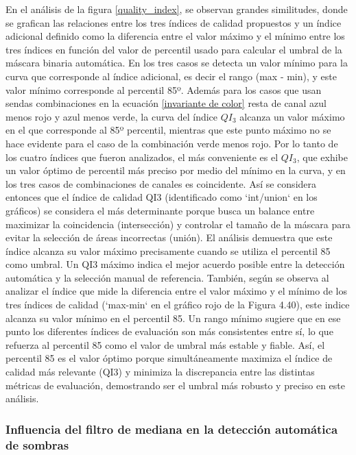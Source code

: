 


En el análisis de la figura \ref{quality_index}, se observan grandes similitudes, donde se grafican las relaciones entre los tres índices de calidad propuestos y un índice adicional definido como la diferencia entre el valor máximo y el mínimo entre los tres índices en función del valor de percentil usado para calcular el umbral de la máscara binaria automática. En los tres casos se detecta un valor mínimo para la curva que corresponde al índice adicional, es decir el rango (max - min), y este valor mínimo corresponde al percentil 85º. Además para los casos que usan sendas combinaciones en la ecuación \ref{invariante de color} resta de canal azul menos rojo y azul menos verde, la curva del índice $QI_3$ alcanza un valor máximo en el que corresponde al 85º percentil, mientras que este punto máximo no se hace evidente para el caso de la combinación verde menos rojo. Por lo tanto de los cuatro índices que fueron analizados, el más conveniente es el $QI_3$, que exhibe un valor óptimo de percentil más preciso por medio del mínimo en la curva, y en los tres casos de combinaciones de canales es coincidente.
Así se considera entonces que el índice de calidad QI3 (identificado como `int/union` en los gráficos) se considera el más determinante porque busca un balance entre maximizar la coincidencia (intersección) y controlar el tamaño de la máscara para evitar la selección de áreas incorrectas (unión).  El análisis demuestra que este índice alcanza su valor máximo precisamente cuando se utiliza el percentil 85 como umbral. Un QI3 máximo indica el mejor acuerdo posible entre la detección automática y la selección manual de referencia.
También, según se observa al analizar el índice que mide la diferencia entre el valor máximo y el mínimo de los tres índices de calidad (`max-min` en el gráfico rojo de la Figura 4.40), este indice alcanza su valor mínimo en el percentil 85. Un rango mínimo sugiere que en ese punto los diferentes índices de evaluación son más consistentes entre sí, lo que refuerza al percentil 85 como el valor de umbral más estable y fiable.
Así, el percentil 85 es el valor óptimo porque simultáneamente maximiza el índice de calidad más relevante (QI3) y minimiza la discrepancia entre las distintas métricas de evaluación, demostrando ser el umbral más robusto y preciso en este análisis.

\subsubsection{Influencia del filtro de mediana en la detección automática de sombras}

